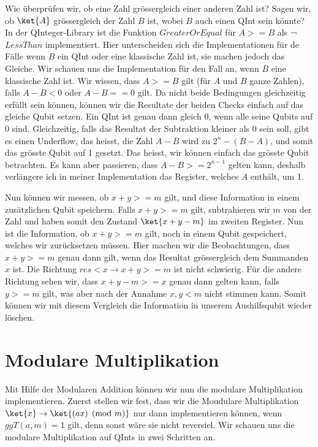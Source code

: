 Wie überprüfen wir, ob eine Zahl grössergleich einer anderen Zahl ist? Sagen wir, ob $\ket{A}$ grössergleich der Zahl $B$ ist, wobei $B$ auch einen QInt sein könnte? In der QInteger-Library ist die Funktion $GreaterOrEqual$ für $A >= B$ als ¬$LessThan$ implementiert. Hier unterscheiden sich die Implementationen für de Fälle wenn $B$ ein QInt oder eine klassische Zahl ist, sie machen jedoch das Gleiche. Wir schauen uns die Implementation für den Fall an, wenn $B$ eine klassische Zahl ist. Wir wissen, dass $A >= B$ gilt (für $A$ und $B$ ganze Zahlen), falls $A - B < 0$ oder $A - B == 0$ gilt. Da nicht beide Bedingungen gleichzeitig erfüllt sein können, können wir die Resultate der beiden Checks einfach auf das gleiche Qubit setzen. Ein QInt ist genau dann gleich 0, wenn alle seine Qubits auf 0 sind. Gleichzeitig, falls das Resultat der Subtraktion kleiner als $0$ sein soll, gibt es einen Underflow, das heisst, die Zahl $A - B$ wird zu $2^n - (B - A)$, und somit das grösste Qubit auf 1 gesetzt. Das heisst, wir können einfach das grösste Qubit betrachten. Es kann aber passieren, dass $A - B >= 2^{n - 1}$ gelten kann, deshalb verlängere ich in meiner Implementation das Register, welches $A$ enthält, um 1.



Nun können wir messen, ob $x + y >= m$ gilt, und diese Information in einem zusätzlichen Qubit speichern. Falls $x + y >= m$ gilt, subtrahieren wir $m$ von der Zahl und haben somit den Zustand $\ket{x + y - m}$ im zweiten Register. Nun ist die Information, ob $x + y >= m$ gilt, noch in einem Qubit gespeichert, welches wir zurücksetzen müssen. Hier machen wir die Beobachtungen, dass $x + y >= m$ genau dann gilt, wenn das Resultat grössergleich dem Summanden $x$ ist. Die Richtung $res < x \rightarrow x + y >= m$ ist nicht schwierig. Für die andere Richtung sehen wir, dass $x + y - m >= x$ genau dann gelten kann, falls $y >= m$ gilt, was aber nach der Annahme $x, y < m$ nicht stimmen kann. Somit können wir mit diesem Vergleich die Information in unserem Aushilfsqubit wieder löschen.

\section{Modulare Multiplikation}
Mit Hilfe der Modularen Addition können wir nun die modulare Multiplikation implementieren. Zuerst stellen wir fest, dass wir die Moudulare Multiplikation $\ket{x} \rightarrow \ket{(ax) \pmod{m}}$ nur dann implementieren können, wenn $ggT(a, m) = 1$ gilt, denn sonst wäre sie nicht reversiel. \newline
Wir schauen uns die modulare Multiplikation auf QInts in zwei Schritten an.

